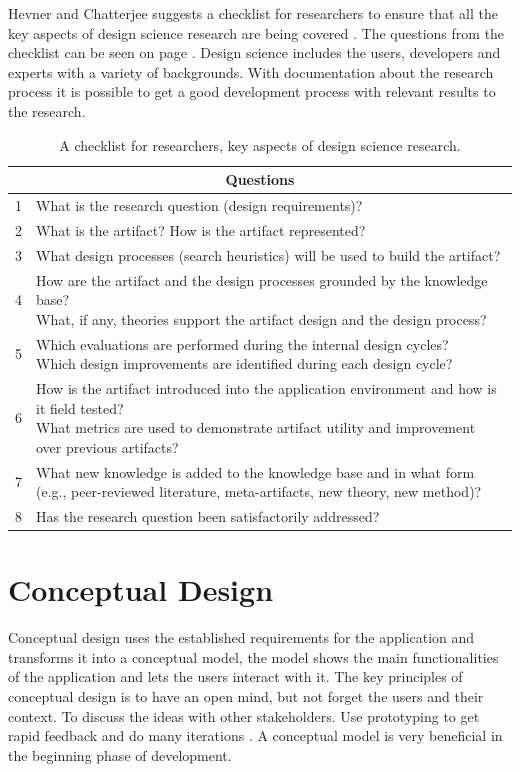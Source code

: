 Hevner and Chatterjee suggests a checklist for researchers to ensure that all the key aspects of design science research are being covered \cite{Hevner2010}. The questions from the checklist can be seen on page \pageref{tab:1} . Design science includes the users, developers and experts with a variety of backgrounds. With documentation about the research process it is possible to get a good development process with relevant results to the research.

\newpage
\begin{table}
\centering
\caption{A checklist for researchers, key aspects of design science research.}
\begin{tabular}{ |l|l| }
  \hline
  \multicolumn{2}{|c|}{Questions} \\
  \hline
1 & What is the research question (design requirements)?\\ 
\hline
2 & What is the artifact? How is the artifact represented?\\
\hline
3 & What design processes (search heuristics) will be used to build the artifact?\\ 
\hline
4 &\makecell[l]{ How are the artifact and the design processes grounded by the knowledge base? \\What, if any, theories support the artifact design and the design process?} \\
\hline
5 &\makecell[l]{ Which evaluations are performed during the internal design cycles?\\ Which design improvements are identified during each design cycle?}\\ 
\hline
6 & \makecell[l]{How is the artifact introduced into the application environment and how is it field tested?\\ What metrics are used to demonstrate artifact utility and improvement over previous artifacts?}\\ 
\hline
7 &\makecell[l]{ What new knowledge is added to the knowledge base and in what form \\ (e.g., peer-reviewed literature, meta-artifacts, new theory, new method)?}\\ 
\hline
8 & Has the research question been satisfactorily addressed?\\
 \hline
  
\end{tabular}
\label{tab:1}

\end{table}

\section{Conceptual Design} \label{concept}
Conceptual design uses the established requirements for the application and transforms it into a conceptual model\cite{interactiondesignbook}, the model shows the main functionalities of the application and lets the users interact with it. The key principles of conceptual design is to have an open mind, but not forget the users and their context. To discuss the ideas with other stakeholders. Use prototyping to get rapid feedback and do many iterations \cite{interactiondesignbook}. A conceptual model is very beneficial in the beginning phase of development.
